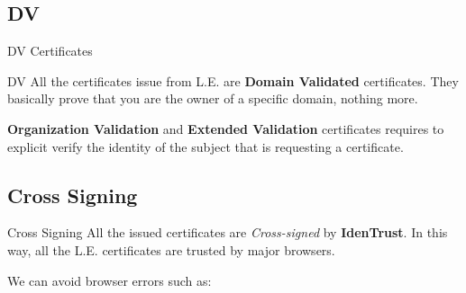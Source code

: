 \documentclass[xcolor=svgnames,11pt]{beamer}
\begin{document}
\subsection{DV}
\begin{frame}{DV Certificates}
\begin{block}{DV}
All the certificates issue from L.E. are \textbf{Domain Validated} certificates. They basically prove that you are the owner of a specific domain, nothing more.
\end{block}
\medskip\pause

\textbf{Organization Validation} and \textbf{Extended Validation} certificates 
requires to explicit verify the identity of the subject that is requesting a certificate.

\end{frame}

\subsection{Cross Signing}
\begin{frame}{Cross Signing}
All the issued certificates are \emph{Cross-signed} by \textbf{IdenTrust}.
In this way, all the L.E. certificates are trusted by major browsers.

\medskip\pause

We can avoid browser errors such as:

\end{frame}
\end{document}
